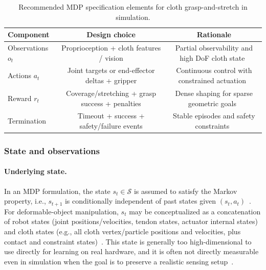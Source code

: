 \begin{table}[htb]
    \centering
    \caption{Recommended \ac{MDP} specification elements for cloth grasp-and-stretch in simulation.}\label{tab:cloth_mdp_summary}
    \begin{tabular}{l c c}
    \hline
    \textbf{Component} & \textbf{Design choice} & \textbf{Rationale} \\
    \hline
    Observations $o_t$ & Proprioception + cloth features / vision & Partial observability and high DoF cloth state~\cite{Lin2021SoftGym,Spaan2012POMDP} \\
    Actions $a_t$ & Joint targets or end-effector deltas + gripper & Continuous control with constrained actuation~\cite{Siciliano2009Robotics,isaaclab_mdp_terms_api} \\
    Reward $r_t$ & Coverage/stretching + grasp success + penalties & Dense shaping for sparse geometric goals~\cite{Lin2021SoftGym,Seita2020FabricSmoothing} \\
    Termination & Timeout + success + safety/failure events & Stable episodes and safety constraints~\cite{isaaclab_mdp_terms_api,isaaclab_envs_api} \\
    \hline
    \end{tabular}
\end{table}

\subsubsection{State and observations}

\paragraph{Underlying state.}
In an \ac{MDP} formulation, the state $s_t \in \mathcal{S}$ is assumed to satisfy the Markov property, i.e., $s_{t+1}$ is conditionally independent of past states given $(s_t,a_t)$~\cite{Puterman1994,SuttonBarto2018}. For deformable-object manipulation, $s_t$ may be conceptualized as a concatenation of robot states (joint positions/velocities, tendon states, actuator internal states) and cloth states (e.g., all cloth vertex/particle positions and velocities, plus contact and constraint states)~\cite{Lin2021SoftGym,Kadi2023ClothLikeReview}. This state is generally too high-dimensional to use directly for learning on real hardware, and it is often not directly measurable even in simulation when the goal is to preserve a realistic sensing setup~\cite{Lin2021SoftGym,Kadi2023ClothLikeReview}.


